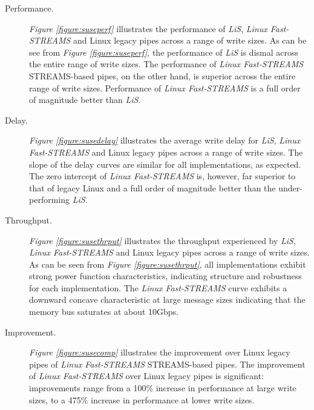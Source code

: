 \documentclass[letterpaper,final,notitlepage,twocolumn,10pt,twoside]{article}
\begin{document}
\begin{description}

\item[Performance.]

\textit{Figure \ref{figure:suseperf}}
illustrates the performance of \textsl{LiS}, \textsl{Linux Fast-STREAMS} and Linux legacy pipes
across a range of write sizes.  As can be see from \textit{Figure \ref{figure:suseperf}}, the
performance of \textsl{LiS} is dismal across the entire range of write sizes.  The performance of
\textsl{Linux Fast-STREAMS} STREAMS-based pipes, on the other hand, is superior across the entire
range of write sizes.  Performance of \textsl{Linux Fast-STREAMS} is a full order of magnitude
better than \textsl{LiS}.

\item[Delay.]

\textit{Figure \ref{figure:susedelay}}
illustrates the average write delay for \textsl{LiS}, \textsl{Linux Fast-STREAMS} and Linux legacy
pipes across a range of write sizes.  The slope of the delay curves are similar for all
implementations, as expected.  The zero intercept of \textsl{Linux Fast-STREAMS} is, however, far
superior to that of legacy Linux and a full order of magnitude better than the under-performing
\textsl{LiS}.

\item[Throughput.]

\textit{Figure \ref{figure:susethrput}}
illustrates the throughput experienced by \textsl{LiS}, \textsl{Linux Fast-STREAMS} and Linux legacy
pipes across a range of write sizes.  As can be seen from \textit{Figure \ref{figure:susethrput}},
all implementations exhibit strong power function characteristics, indicating structure and
robustness for each implementation.  The \textsl{Linux Fast-STREAMS} curve exhibits a downward
concave characteristic at large message sizes indicating that the memory bus saturates at about
10Gbps.

\item[Improvement.]

\textit{Figure \ref{figure:susecomp}}
illustrates the improvement over Linux legacy pipes of \textsl{Linux Fast-STREAMS} STREAMS-based
pipes.  The improvement of \textsl{Linux Fast-STREAMS} over Linux legacy pipes is significant:
improvements range from a 100\% increase in performance at large write sizes, to a 475\% increase in
performance at lower write sizes.

\end{description}
\end{document}
